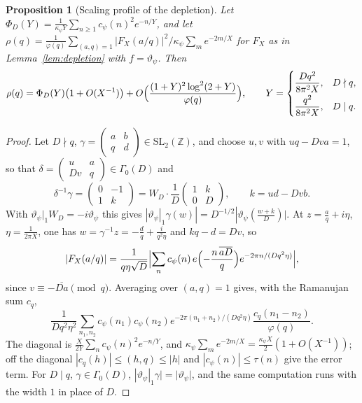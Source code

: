 ﻿\documentclass[11pt]{amsart}
\newtheorem{proposition}[theorem]{Proposition}
\theoremstyle{remark}
\newcommand{\Z}{\mathbb Z}
\newcommand{\vt}{\vartheta}
\begin{document}
\begin{proposition}[Scaling profile of the depletion]\label{prop:profile}
Let $\Phi_D(Y)=\frac1{\kappa_\psi Y}\sum_{n\ge1}c_\psi(n)^2e^{-n/Y}$, and let $\rho(q)=\frac1{\varphi(q)}\sum_{(a,q)=1}|F_X(a/q)|^2\big/\kappa_\psi\sum_me^{-2m/X}$ for $F_X$ as in Lemma~\ref{lem:depletion} with $f=\vt_\psi$. Then
\[
\rho(q)=\Phi_D(Y)\bigl(1+O(X^{-1})\bigr)+O\Bigl(\frac{(1+Y)^2\log^2(2+Y)}{\varphi(q)}\Bigr),\qquad Y=\begin{cases}\dfrac{Dq^2}{8\pi^2X},&D\nmid q,\\[2mm]\dfrac{q^2}{8\pi^2X},&D\mid q.\end{cases}
\]
\end{proposition}
\begin{proof}
Let $D\nmid q$, $\gamma=\left(\begin{smallmatrix}a&b\\q&d\end{smallmatrix}\right)\in\mathrm{SL}_2(\Z)$, and choose $u,v$ with $uq-Dva=1$, so that $\delta=\left(\begin{smallmatrix}u&a\\Dv&q\end{smallmatrix}\right)\in\Gamma_0(D)$ and
\[
\delta^{-1}\gamma=\begin{pmatrix}0&-1\\1&k\end{pmatrix}=W_D\cdot\frac1D\begin{pmatrix}1&k\\0&D\end{pmatrix},\qquad k=ud-Dvb.
\] With $\vt_\psi|_1W_D=-i\vt_\psi$ this gives $|\vt_\psi|_1\gamma(w)|=D^{-1/2}|\vt_\psi(\frac{w+k}D)|$. At $z=\frac aq+i\eta$, $\eta=\frac1{2\pi X}$, one has $w=\gamma^{-1}z=-\frac dq+\frac i{q^2\eta}$ and $kq-d=Dv$, so
\[
|F_X(a/q)|=\frac1{q\eta\sqrt D}\Bigl|\sum_nc_\psi(n)\,e\Bigl(-\frac{n\,\overline{aD}}q\Bigr)e^{-2\pi n/(Dq^2\eta)}\Bigr|,
\]
since $v\equiv-\overline{Da}\pmod q$. Averaging over $(a,q)=1$ gives, with the Ramanujan sum $c_q$,
\[
\frac1{Dq^2\eta^2}\sum_{n_1,n_2}c_\psi(n_1)c_\psi(n_2)e^{-2\pi(n_1+n_2)/(Dq^2\eta)}\frac{c_q(n_1-n_2)}{\varphi(q)}.
\] The diagonal is $\frac{X}{2Y}\sum_nc_\psi(n)^2e^{-n/Y}$, and $\kappa_\psi\sum_me^{-2m/X}=\frac{\kappa_\psi X}2(1+O(X^{-1}))$; off the diagonal $|c_q(h)|\le(h,q)\le|h|$ and $|c_\psi(n)|\le\tau(n)$ give the error term. For $D\mid q$, $\gamma\in\Gamma_0(D)$, $|\vt_\psi|_1\gamma|=|\vt_\psi|$, and the same computation runs with the width $1$ in place of $D$.
\end{proof}
\end{document}
